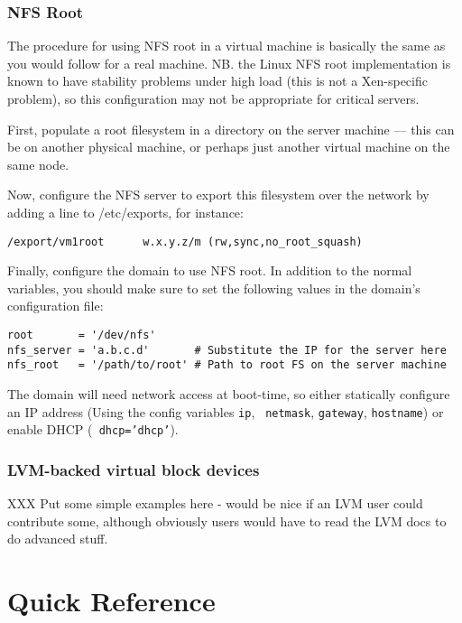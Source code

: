 \documentclass[11pt,twoside,final,openright]{xenstyle}
\begin{document}
\section{NFS Root}

The procedure for using NFS root in a virtual machine is basically the
same as you would follow for a real machine.  NB. the Linux NFS root
implementation is known to have stability problems under high load
(this is not a Xen-specific problem), so this configuration may not be
appropriate for critical servers.

First, populate a root filesystem in a directory on the server machine
--- this can be on another physical machine, or perhaps just another
virtual machine on the same node.

Now, configure the NFS server to export this filesystem over the
network by adding a line to /etc/exports, for instance:

\begin{verbatim}
/export/vm1root      w.x.y.z/m (rw,sync,no_root_squash)
\end{verbatim}

Finally, configure the domain to use NFS root.  In addition to the
normal variables, you should make sure to set the following values in
the domain's configuration file:

\begin{verbatim}
root       = '/dev/nfs'
nfs_server = 'a.b.c.d'       # Substitute the IP for the server here
nfs_root   = '/path/to/root' # Path to root FS on the server machine
\end{verbatim}

The domain will need network access at boot-time, so either statically
configure an IP address (Using the config variables {\tt ip}, {\tt
netmask}, {\tt gateway}, {\tt hostname}) or enable DHCP ({\tt
dhcp='dhcp'}).

\section{LVM-backed virtual block devices}

XXX Put some simple examples here - would be nice if an LVM user could
contribute some, although obviously users would have to read the LVM
docs to do advanced stuff.

\part{Quick Reference}
\end{document}
